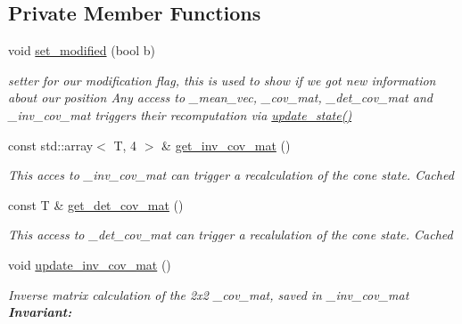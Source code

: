 \subsection*{Private Member Functions}
\begin{DoxyCompactItemize}
\item 
\mbox{\label{classclara_1_1cone__state_ac9712fb4aee53df62da1cd320a45f813}} 
void \hyperlink{classclara_1_1cone__state_ac9712fb4aee53df62da1cd320a45f813}{set\+\_\+modified} (bool b)
\begin{DoxyCompactList}\small\item\em setter for our modification flag, this is used to show if we got new information about our position Any access to {\ttfamily \+\_\+mean\+\_\+vec}, {\ttfamily \+\_\+cov\+\_\+mat}, {\ttfamily \+\_\+det\+\_\+cov\+\_\+mat} and {\ttfamily \+\_\+inv\+\_\+cov\+\_\+mat} triggers their recomputation via {\ttfamily \hyperlink{classclara_1_1cone__state_a8cb6454f6a731f69d3e85382b0ae40b4}{update\+\_\+state()}} \end{DoxyCompactList}\item 
const std\+::array$<$ T, 4 $>$ \& \hyperlink{classclara_1_1cone__state_a7a0584b86ba125a2c232f26d4d1e4a38}{get\+\_\+inv\+\_\+cov\+\_\+mat} ()
\begin{DoxyCompactList}\small\item\em This acces to {\ttfamily \+\_\+inv\+\_\+cov\+\_\+mat} can trigger a recalculation of the cone state. {\itshape Cached} \end{DoxyCompactList}\item 
\mbox{\label{classclara_1_1cone__state_a5775993f75df93a3121c1fb53ef48777}} 
const T \& \hyperlink{classclara_1_1cone__state_a5775993f75df93a3121c1fb53ef48777}{get\+\_\+det\+\_\+cov\+\_\+mat} ()
\begin{DoxyCompactList}\small\item\em This access to {\ttfamily \+\_\+det\+\_\+cov\+\_\+mat} can trigger a recalulation of the cone state. {\itshape Cached} \end{DoxyCompactList}\item 
void \hyperlink{classclara_1_1cone__state_a7b0d6ab972d3d003eaad439c630c1c73}{update\+\_\+inv\+\_\+cov\+\_\+mat} ()
\begin{DoxyCompactList}\small\item\em Inverse matrix calculation of the 2x2 {\ttfamily \+\_\+cov\+\_\+mat}, saved in {\ttfamily \+\_\+inv\+\_\+cov\+\_\+mat} {\bfseries Invariant\+:} \end{DoxyCompactList}\item 

\end{DoxyCompactItemize}
